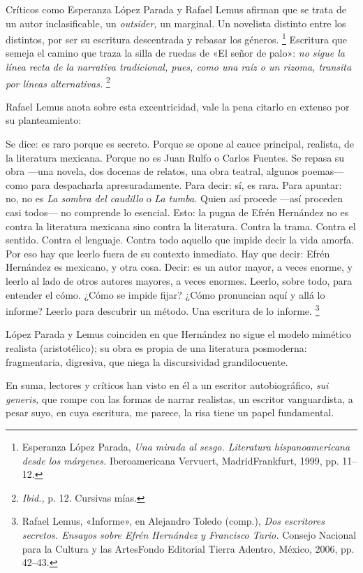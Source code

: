 \documentclass[14pt,twoside,final]{extbook} %
\let\oldfootnote\footnote
\renewcommand\footnote[1]{%
\oldfootnote{\hspace{1mm}#1}}
\begin{document}
Críticos como Esperanza López Parada y Rafael Lemus afirman que se trata de un autor inclasificable, un \emph{outsider,} un marginal. Un novelista distinto entre los distintos, por ser su escritura descentrada y rebasar los géneros.\footnote{Esperanza López Parada, \emph{Una mirada al sesgo. Literatura hispanoamericana desde los márgenes.} Iberoamericana Vervuert, Madrid\kernedslash Frankfurt, 1999, pp. 11--12.} Escritura que semeja el camino que traza la silla de ruedas de «El señor de palo»: \emph{no sigue la línea recta de la narrativa tradicional, pues, como una raíz o un rizoma, transita por líneas alternativas.}\footnote{\emph{Ibid.,} p. 12. Cursivas mías.}

Rafael Lemus anota sobre esta excentricidad, vale la pena citarlo en extenso por su planteamiento:
\begin{quoting}
Se dice: es raro porque es secreto. Porque se opone al cauce principal, realista, de la literatura mexicana. Porque no es Juan Rulfo o Carlos Fuentes. Se repasa su obra ---una novela, dos docenas de
relatos, una obra teatral, algunos poemas--- como para despacharla apresuradamente. Para decir: sí, es rara. Para apuntar: no, no es \emph{La sombra del caudillo} o \emph{La tumba.} Quien así procede ---así proceden casi todos--- no comprende lo esencial. Esto: la pugna de Efrén Hernández no es contra la literatura mexicana sino contra la literatura. Contra la trama. Contra el sentido. Contra el lenguaje. Contra todo aquello que impide decir la vida amorfa. Por eso hay que leerlo fuera de su contexto inmediato. Hay que decir: Efrén Hernández es mexicano, y otra cosa. Decir: es un autor mayor, a veces enorme, y leerlo al lado de otros autores mayores, a veces enormes. Leerlo, sobre todo, para entender el cómo. ¿Cómo se impide fijar? ¿Cómo pronuncian aquí y allá lo informe? Leerlo para descubrir un método. Una escritura de lo informe.\footnote{Rafael Lemus, «Informe», en Alejandro Toledo (comp.), \emph{Dos escritores secretos. Ensayos sobre Efrén Hernández y Francisco Tario.} Consejo Nacional para la Cultura y las Artes\kernedslash Fondo Editorial Tierra Adentro, México, 2006, pp. 42--43.}
\end{quoting}
López Parada y Lemus coinciden en que Hernández no sigue el modelo mimético realista (aristotélico); su obra es propia de una literatura posmoderna: fragmentaria, digresiva, que niega la discursividad grandilocuente.

En suma, lectores y críticos han visto en él a un escritor autobiográfico, \emph{sui generis,} que rompe con las formas de narrar realistas, un escritor vanguardista, a pesar suyo, en cuya escritura, me parece, la risa tiene un papel fundamental.
\end{document}

